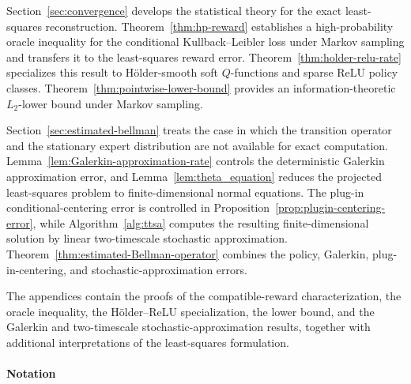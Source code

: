 \documentclass{article}
\theoremstyle{definition}
\theoremstyle{remark}
\theoremstyle{plain}
\numberwithin{equation}{section}
\begin{document}
Section~\ref{sec:convergence} develops the statistical theory for the
exact least-squares reconstruction.
Theorem~\ref{thm:hp-reward} establishes a high-probability oracle
inequality for the conditional Kullback--Leibler loss under Markov
sampling and transfers it to the least-squares reward error.
Theorem~\ref{thm:holder-relu-rate} specializes this result to
H\"older-smooth soft \(Q\)-functions and sparse ReLU policy classes.
Theorem~\ref{thm:pointwise-lower-bound} provides an information-theoretic
\(L_2\)-lower bound under Markov sampling.

Section~\ref{sec:estimated-bellman} treats the case in which the
transition operator and the stationary expert distribution are not
available for exact computation.
Lemma~\ref{lem:Galerkin-approximation-rate} controls the deterministic
Galerkin approximation error, and
Lemma~\ref{lem:theta_equation} reduces the projected least-squares
problem to finite-dimensional normal equations.
The plug-in conditional-centering error is controlled in
Proposition~\ref{prop:plugin-centering-error}, while
Algorithm~\ref{alg:ttsa} computes the resulting finite-dimensional
solution by linear two-timescale stochastic approximation.
Theorem~\ref{thm:estimated-Bellman-operator} combines the policy,
Galerkin, plug-in-centering, and stochastic-approximation errors.

The appendices contain the proofs of the compatible-reward
characterization, the oracle inequality, the H\"older--ReLU
specialization, the lower bound, and the Galerkin and two-timescale
stochastic-approximation results, together with additional
interpretations of the least-squares formulation.

\paragraph{Notation}
\end{document}
